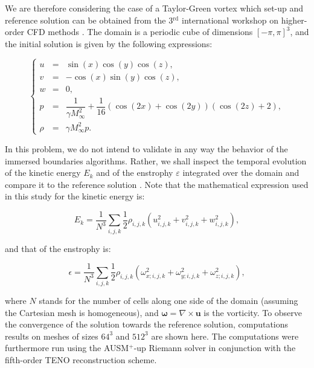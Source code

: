 We are therefore considering the case of a Taylor-Green vortex which set-up and reference solution can be obtained from the 3$^{\text{rd}}$ international workshop on higher-order CFD methods \cite{diosady2015case}.
The domain is a periodic cube of dimensions $[-\pi, \pi]^3$, and the initial solution is given by the following expressions:

\begin{equation}
    \left\lbrace
    \begin{array}{ccl}
        u &=& \sin{\left( x \right)} \cos{ \left( y \right) } \cos{ \left( z \right) }, \\[0.6em]
        v &=& -\cos{\left( x \right)} \sin{ \left( y \right) } \cos{ \left( z \right) }, \\[0.6em]
        w &=& 0, \\[0.6em]
        p &=& \dfrac{1}{\gamma M_{\infty}^2} + \dfrac{1}{16}\left( \cos(2 x) + \cos(2 y) \right) \left( \cos(2 z) + 2\right), \\[0.6em]
        \rho &=& \gamma M_{\infty}^2 p.
    \end{array}
    \right.
\end{equation}

In this problem, we do not intend to validate in any way the behavior of the immersed boundaries algorithms.
Rather, we shall inspect the temporal evolution of the kinetic energy $E_k$ and of the enstrophy $\varepsilon$ integrated over the domain and compare it to the reference solution \cite{diosady2015case}.
Note that the mathematical expression used in this study for the kinetic energy is:

\begin{equation}
    E_k = \dfrac{1}{N^3} \sum_{i,j,k} \dfrac{1}{2} \rho_{i,j,k} \left(u_{i,j,k}^2 + v_{i,j,k}^2 + w_{i,j,k}^2\right),
    \label{eq:kinetic_eqn}
\end{equation}

and that of the enstrophy is:

\begin{equation}
    \epsilon = \dfrac{1}{N^3}\sum_{i,j,k} \dfrac{1}{2} \rho_{i,j,k} \left( \omega_{x; i,j,k}^2 + \omega_{y; i,j,k}^2 + \omega_{z; i,j,k}^2 \right),
    \label{eq:enstrophy}
\end{equation}

where $N$ stands for the number of cells along one side of the domain (assuming the Cartesian mesh is homogeneous), and $\mathbf{\omega} = \nabla \times \mathbf{u}$ is the vorticity.
To observe the convergence of the solution towards the reference solution, computations results on meshes of sizes $64^3$ and $512^3$ are shown here.
The computations were furthermore run using the AUSM$^+$-up Riemann solver in conjunction with the fifth-order TENO reconstruction scheme.

